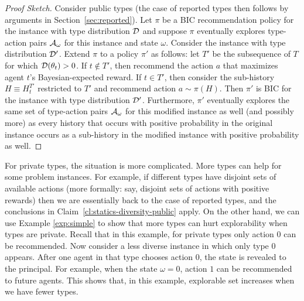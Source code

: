 
\begin{proof}[Proof Sketch]
Consider public types (the case of reported types then follows by arguments in Section~\ref{sec:reported}).  Let $\pi$ be a BIC recommendation policy for the instance with type distribution $\mathcal{D}$ and suppose $\pi$ eventually explores type-action pairs $\mathcal{A}_{\omega}$ for this instance and state $\omega$.  Consider the instance with type distribution $\mathcal{D}'$.  Extend $\pi$ to a policy $\pi'$ as follows: let $T'$ be the subsequence of $T$ for which $\mathcal{D}(\theta_t)>0$. If $t\not\in T'$, then recommend the action $a$ that maximizes agent $t$'s Bayesian-expected reward.  If $t\in T'$, then consider the sub-history $H\equiv H^{T'}_t$ restricted to $T'$ and recommend action $a\sim\pi(H)$.  Then $\pi'$ is BIC for the instance with type distribution $\mathcal{D}'$. Furthermore, $\pi'$ eventually explores the same set of type-action pairs $\mathcal{A}_{\omega}$ for this modified instance as well (and possibly more) as every history that occurs with positive probability in the original instance occurs as a sub-history in the modified instance with positive probability as well.
\end{proof}

For private types, the situation is more complicated. More types can help for some problem instances. For example, if different types have disjoint sets of available actions (more formally: say, disjoint sets of actions with positive rewards) then we are essentially back to the case of reported types, and the conclusions in Claim~\ref{cl:statics-diversity-public} apply. On the other hand, we can use Example \ref{exp:simple} to show that more types can hurt explorability when types are private. Recall that in this example, for private types only action 0 can be recommended. Now consider a less diverse instance in which only type 0 appears. After one agent in that type chooses action 0, the state is revealed to the principal. For example, when the state $\omega = 0$, action $1$ can be recommended to future agents. This shows that,  in this example, explorable set increases when we have fewer types.
